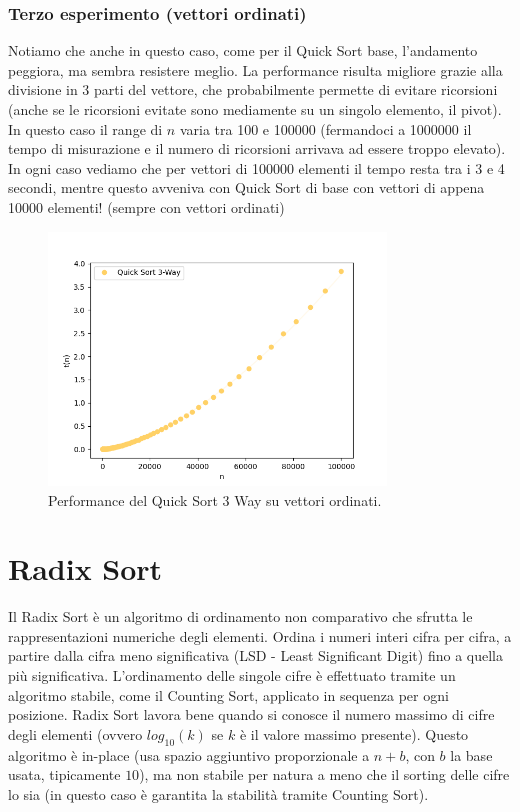 \documentclass[a4paper, 12pt, oneside]{book}
\begin{document}
\subsection{Terzo esperimento (vettori ordinati)}

Notiamo che anche in questo caso, come per il Quick Sort base, l'andamento peggiora, ma sembra resistere meglio.
La performance risulta migliore grazie alla divisione in 3 parti del vettore, che probabilmente permette di evitare ricorsioni (anche se le ricorsioni evitate sono mediamente su un singolo elemento, il pivot).
In questo caso il range di \(n\) varia tra 100 e 100000 (fermandoci a 1000000 il tempo di misurazione e il numero di ricorsioni arrivava ad essere troppo elevato). In ogni caso vediamo che per vettori di 100000 elementi il tempo resta tra i 3 e 4 secondi, mentre questo avveniva con Quick Sort di base con vettori di appena 10000 elementi! (sempre con vettori ordinati)

\begin{figure}[H]
    \centering
    \includegraphics[width=0.8\textwidth]{images/quicksort3wayCasoPeggiore.png}
    \caption{Performance del Quick Sort 3 Way su vettori ordinati.}
    \label{fig:quick_sort_3_way_m}
\end{figure}



\chapter{Radix Sort}\label{chap:Radix Sort} %

Il Radix Sort è un algoritmo di ordinamento non comparativo che sfrutta le rappresentazioni numeriche degli elementi. Ordina i numeri interi cifra per cifra, a partire dalla cifra meno significativa (LSD - Least Significant Digit) fino a quella più significativa. L'ordinamento delle singole cifre è effettuato tramite un algoritmo stabile, come il Counting Sort, applicato in sequenza per ogni posizione.
Radix Sort lavora bene quando si conosce il numero massimo di cifre degli elementi (ovvero \(log_{10}(k)\) se \(k\) è il valore massimo presente).
Questo algoritmo è in-place (usa spazio aggiuntivo proporzionale a \(n + b\), con \(b\) la base usata, tipicamente \(10\)), ma non stabile per natura a meno che il sorting delle cifre lo sia (in questo caso è garantita la stabilità tramite Counting Sort).
\end{document}
